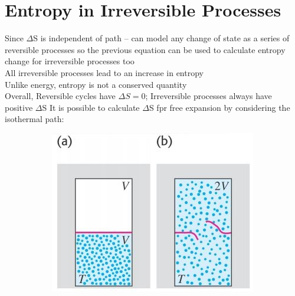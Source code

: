 \documentclass[a4paper, 11pt, fleqn, normalem]{report}
\begin{document}
\section{Entropy in Irreversible Processes}
Since $\Delta$S is independent of path -- can model any change of state as a series of reversible processes so the previous equation can be used to calculate entropy change for irreversible processes too \\
All irreversible processes lead to an increase in entropy \\
Unlike energy, entropy is not a conserved quantity \\
Overall, Reversible cycles have ${\Delta}S = 0$; Irreversible processes always have positive $\Delta$S
It is possible to calculate $\Delta$S fpr free expansion by considering the isothermal path:
\begin{figure}[H]
	\begin{subfigure}{0.4\textwidth}
		\includegraphics[width=\textwidth]{Entropy1.jpg}
	\end{subfigure}
	\begin{subfigure}{0.3\textwidth}

\end{subfigure}
\end{figure}
\end{document}
